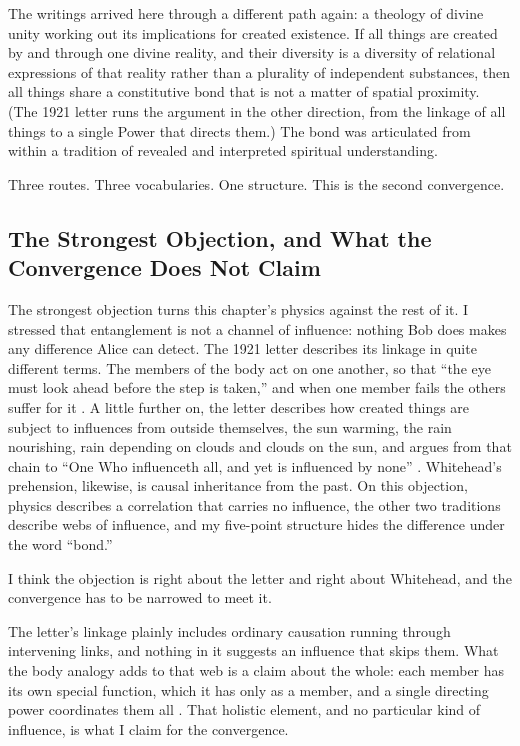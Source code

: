 The \bahai writings arrived here through a different path again: a theology of divine unity working out its implications for created existence. If all things are created by and through one divine reality, and their diversity is a diversity of relational expressions of that reality rather than a plurality of independent substances, then all things share a constitutive bond that is not a matter of spatial proximity. (The 1921 letter runs the argument in the other direction, from the linkage of all things to a single Power that directs them.) The bond was articulated from within a tradition of revealed and interpreted spiritual understanding.

Three routes. Three vocabularies. One structure. This is the second convergence.

\subsection*{The Strongest Objection, and What the Convergence Does Not Claim}

The strongest objection turns this chapter's physics against the rest of it. I stressed that entanglement is not a channel of influence: nothing Bob does makes any difference Alice can detect. The 1921 letter describes its linkage in quite different terms. The members of the body act on one another, so that ``the eye must look ahead before the step is taken,'' and when one member fails the others suffer for it \citep[\S 21]{SelectionsAbdul}. A little further on, the letter describes how created things are subject to influences from outside themselves, the sun warming, the rain nourishing, rain depending on clouds and clouds on the sun, and argues from that chain to ``One Who influenceth all, and yet is influenced by none'' \citep[\S 21]{SelectionsAbdul}. Whitehead's prehension, likewise, is causal inheritance from the past. On this objection, physics describes a correlation that carries no influence, the other two traditions describe webs of influence, and my five-point structure hides the difference under the word ``bond.''

I think the objection is right about the letter and right about Whitehead, and the convergence has to be narrowed to meet it.

The letter's linkage plainly includes ordinary causation running through intervening links, and nothing in it suggests an influence that skips them. What the body analogy adds to that web is a claim about the whole: each member has its own special function, which it has only as a member, and a single directing power coordinates them all \citep[\S 21]{SelectionsAbdul}. That holistic element, and no particular kind of influence, is what I claim for the convergence.

